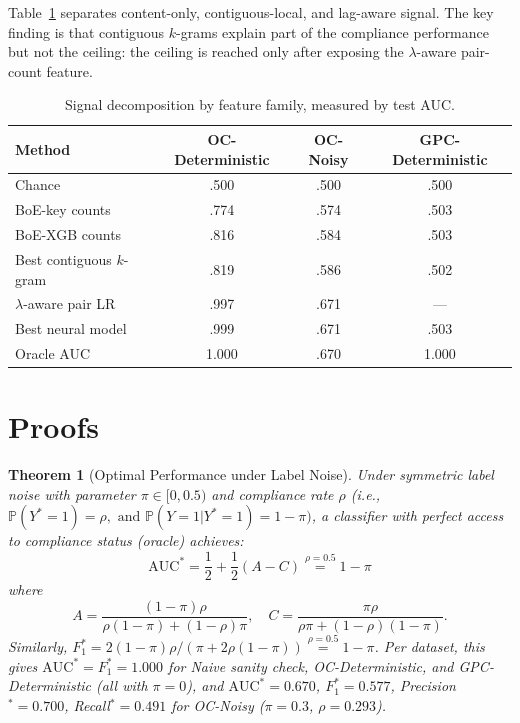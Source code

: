 \documentclass{article}
\theoremstyle{plain}
\newtheorem{theorem}{Theorem}[section]
\theoremstyle{definition}
\theoremstyle{remark}
\begin{document}
Table~\ref{tab:signal_decomposition} separates content-only, contiguous-local,
and lag-aware signal. The key finding is that contiguous \(k\)-grams explain part
of the compliance performance but not the ceiling: the ceiling is reached only
after exposing the \(\lambda\)-aware pair-count feature.

\begin{table}[h]
\centering
\small
\caption{
Signal decomposition by feature family, measured by test AUC.
}
\label{tab:signal_decomposition}
\begin{tabular}{lccc}
\toprule
Method & OC-Deterministic & OC-Noisy & GPC-Deterministic \\
\midrule
Chance & .500 & .500 & .500 \\
BoE-key counts & .774 & .574 & .503 \\
BoE-XGB counts & .816 & .584 & .503 \\
Best contiguous \(k\)-gram & .819 & .586 & .502 \\
\(\lambda\)-aware pair LR & .997 & .671 & --- \\
Best neural model & .999 & .671 & .503 \\
Oracle AUC & 1.000 & .670 & 1.000 \\
\bottomrule
\end{tabular}
\end{table}

\FloatBarrier
\newpage

\section{Proofs}
\label{appendix:proof_theorems}

\begin{theorem}[Optimal Performance under Label Noise]
\label{thm:optimal_performance}
Under symmetric label noise with parameter $\pi \in [0, 0.5)$ and compliance rate $\rho$ (i.e., $\mathbb{P}(Y^{*}=1)=\rho, \text{ and } \mathbb{P}(Y=1|Y^{*}=1)=1-\pi)$, a classifier with perfect access to compliance status (oracle) achieves:
\[
\mathrm{AUC}^* = \frac{1}{2} + \frac{1}{2}(A - C) \overset{\rho=0.5}{=} 1 - \pi
\]
where
\[
A = \frac{(1-\pi)\rho}{\rho(1-\pi) + (1-\rho)\pi}, \quad C = \frac{\pi\rho}{\rho\pi + (1-\rho)(1-\pi)}.
\]
Similarly, $F_1^* = 2(1-\pi)\rho / (\pi + 2\rho(1-\pi)) \overset{\rho=0.5}{=} 1-\pi$. Per dataset, this gives $\mathrm{AUC}^*=F_1^*=1.000$ for Naive sanity check, OC-Deterministic, and GPC-Deterministic (all with $\pi=0$), and $\mathrm{AUC}^*=0.670$, $F_1^*=0.577$, Precision$^*=0.700$, Recall$^*=0.491$ for OC-Noisy ($\pi=0.3$, $\rho=0.293$).
\end{theorem}
\end{document}
